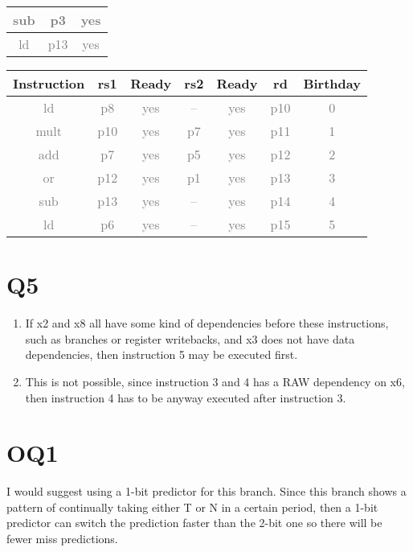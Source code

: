 \documentclass[12pt]{article}
\begin{document}
\begin{enumerate}
\begin{table}[H]
\begin{tabular}{|c|c|c|}
					\hline
					\textcolor{gray}{sub} & \textcolor{gray}{p3} & \textcolor{gray}{yes}\\
					\hline
					\textcolor{gray}{ld} & \textcolor{gray}{p13} & \textcolor{gray}{yes}\\
					\hline
				\end{tabular}
				\hfill
				\begin{tabular}{|c|c|c|c|c|c|c|}
					\hline
					Instruction & rs1 & Ready & rs2 & Ready & rd & Birthday\\
					\hline
					\textcolor{gray}{ld} & \textcolor{gray}{p8} & \textcolor{gray}{yes} & \textcolor{gray}{--} & \textcolor{gray}{yes} & \textcolor{gray}{p10} & \textcolor{gray}{0}\\
					\hline
					\textcolor{gray}{mult} & \textcolor{gray}{p10} & \textcolor{gray}{yes} & \textcolor{gray}{p7} & \textcolor{gray}{yes} & \textcolor{gray}{p11} & \textcolor{gray}{1}\\
					\hline
					\textcolor{gray}{add} & \textcolor{gray}{p7} & \textcolor{gray}{yes} & \textcolor{gray}{p5} & \textcolor{gray}{yes} & \textcolor{gray}{p12} & \textcolor{gray}{2}\\
					\hline
					\textcolor{gray}{or} & \textcolor{gray}{p12} & \textcolor{gray}{yes} & \textcolor{gray}{p1} & \textcolor{gray}{yes} & \textcolor{gray}{p13} & \textcolor{gray}{3}\\
					\hline
					\textcolor{gray}{sub} & \textcolor{gray}{p13} & \textcolor{gray}{yes} & \textcolor{gray}{--} & \textcolor{gray}{yes} & \textcolor{gray}{p14} & \textcolor{gray}{4}\\
					\hline
					\textcolor{gray}{ld} & \textcolor{gray}{p6} & \textcolor{gray}{yes} & \textcolor{gray}{--} & \textcolor{gray}{yes} & \textcolor{gray}{p15} & \textcolor{gray}{5}\\
					\hline
				\end{tabular}
			\end{table}
	\end{enumerate}

\section*{Q5}

	\begin{enumerate}
		\item
			If x2 and x8 all have some kind of dependencies before these instructions, such as branches or register writebacks, and x3 does not have data dependencies, then instruction 5 may be executed first.
		\item
			This is not possible, since instruction 3 and 4 has a RAW dependency on x6, then instruction 4 has to be anyway executed after instruction 3.
	\end{enumerate}

\section*{OQ1}

	I would suggest using a 1-bit predictor for this branch. Since this branch shows a pattern of continually taking either T or N in a certain period, then a 1-bit predictor can switch the prediction faster than the 2-bit one so there will be fewer miss predictions.
\end{document}
